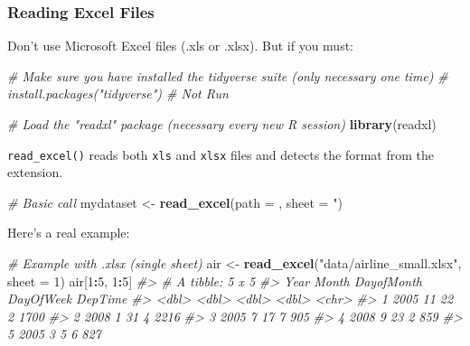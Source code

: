 \documentclass[]{book}
\newenvironment{Shaded}{\begin{snugshade}}{\end{snugshade}}
\newcommand{\KeywordTok}[1]{\textcolor[rgb]{0.13,0.29,0.53}{\textbf{#1}}}
\newcommand{\DataTypeTok}[1]{\textcolor[rgb]{0.13,0.29,0.53}{#1}}
\newcommand{\DecValTok}[1]{\textcolor[rgb]{0.00,0.00,0.81}{#1}}
\newcommand{\StringTok}[1]{\textcolor[rgb]{0.31,0.60,0.02}{#1}}
\newcommand{\CommentTok}[1]{\textcolor[rgb]{0.56,0.35,0.01}{\textit{#1}}}
\newcommand{\OperatorTok}[1]{\textcolor[rgb]{0.81,0.36,0.00}{\textbf{#1}}}
\newcommand{\NormalTok}[1]{#1}
\begin{document}
\subsubsection*{Reading Excel Files}\label{reading-excel-files}

Don't use Microsoft Excel files (.xls or .xlsx). But if you must:

\begin{Shaded}
\begin{Highlighting}[]
\CommentTok{# Make sure you have installed the tidyverse suite (only necessary one time)}
\CommentTok{# install.packages("tidyverse") # Not Run}

\CommentTok{# Load the "readxl" package (necessary every new R session)}
\KeywordTok{library}\NormalTok{(readxl)}
\end{Highlighting}
\end{Shaded}

\texttt{read\_excel()} reads both \texttt{xls} and \texttt{xlsx} files
and detects the format from the extension.

\begin{Shaded}
\begin{Highlighting}[]
\CommentTok{# Basic call}
\NormalTok{mydataset <-}\StringTok{ }\KeywordTok{read_excel}\NormalTok{(}\DataTypeTok{path =}\NormalTok{ , }\DataTypeTok{sheet =} \StringTok{")}
\end{Highlighting}
\end{Shaded}

Here's a real example:

\begin{Shaded}
\begin{Highlighting}[]
\CommentTok{# Example with .xlsx (single sheet)}
\NormalTok{air <-}\StringTok{ }\KeywordTok{read_excel}\NormalTok{(}\StringTok{"data/airline_small.xlsx"}\NormalTok{, }\DataTypeTok{sheet =} \DecValTok{1}\NormalTok{) }
\NormalTok{air[}\DecValTok{1}\OperatorTok{:}\DecValTok{5}\NormalTok{, }\DecValTok{1}\OperatorTok{:}\DecValTok{5}\NormalTok{]}
\CommentTok{#> # A tibble: 5 x 5}
\CommentTok{#>    Year Month DayofMonth DayOfWeek DepTime}
\CommentTok{#>   <dbl> <dbl>      <dbl>     <dbl> <chr>  }
\CommentTok{#> 1  2005    11         22         2 1700   }
\CommentTok{#> 2  2008     1         31         4 2216   }
\CommentTok{#> 3  2005     7         17         7 905    }
\CommentTok{#> 4  2008     9         23         2 859    }
\CommentTok{#> 5  2005     3          5         6 827}
\end{Highlighting}
\end{Shaded}
\end{document}
